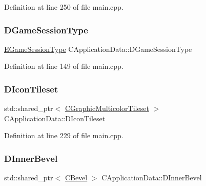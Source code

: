Definition at line 250 of file main.\+cpp.

\hypertarget{classCApplicationData_acd2cc6f5bbb325532c21afc38241c3de}{}\label{classCApplicationData_acd2cc6f5bbb325532c21afc38241c3de} 
\subsubsection{\texorpdfstring{D\+Game\+Session\+Type}{DGameSessionType}}
{\footnotesize\ttfamily \hyperlink{classCApplicationData_a0ec00515bf6b4b469b43ad62d615e3fa}{E\+Game\+Session\+Type} C\+Application\+Data\+::\+D\+Game\+Session\+Type\hspace{0.3cm}{\ttfamily [protected]}}



Definition at line 149 of file main.\+cpp.

\hypertarget{classCApplicationData_a0577767a7fa045a51654b881608b1e7a}{}\label{classCApplicationData_a0577767a7fa045a51654b881608b1e7a} 
\subsubsection{\texorpdfstring{D\+Icon\+Tileset}{DIconTileset}}
{\footnotesize\ttfamily std\+::shared\+\_\+ptr$<$ \hyperlink{classCGraphicMulticolorTileset}{C\+Graphic\+Multicolor\+Tileset} $>$ C\+Application\+Data\+::\+D\+Icon\+Tileset\hspace{0.3cm}{\ttfamily [protected]}}



Definition at line 229 of file main.\+cpp.

\hypertarget{classCApplicationData_a29a687c44dceb9e87a56d96612d59ab5}{}\label{classCApplicationData_a29a687c44dceb9e87a56d96612d59ab5} 
\subsubsection{\texorpdfstring{D\+Inner\+Bevel}{DInnerBevel}}
{\footnotesize\ttfamily std\+::shared\+\_\+ptr$<$ \hyperlink{classCBevel}{C\+Bevel} $>$ C\+Application\+Data\+::\+D\+Inner\+Bevel\hspace{0.3cm}{\ttfamily [protected]}}



